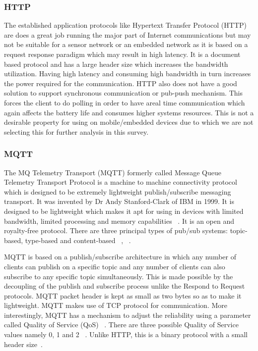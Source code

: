 \documentclass[conference]{IEEEtran}
\begin{document}
\subsubsection{HTTP}
The established application protocols like Hypertext Transfer Protocol (HTTP) are does a great job running the major part of Internet communications but may not be suitable for a sensor network or an embedded network as it is based on a request response paradigm which may result in high latency. It is a document based protocol and has a large header size which increases the bandwidth utilization. Having high latency and consuming high bandwidth in turn increases the power required for the communication. HTTP also does not have a good solution to support synchronous communication or pub-push mechanism. This forces the client to do polling in order to have areal time communication which again affects the battery life and consumes higher systems resources. This is not a desirable property for using on mobile/embedded devices due to which we are not selecting this for further analysis in this survey.

\subsubsection{MQTT}
The MQ Telemetry Transport (MQTT) formerly called Message Queue Telemetry Transport Protocol is a machine to machine connectivity protocol which is designed to be extremely lightweight publish/subscribe messaging transport. It was invented by Dr Andy Stanford-Clark of IBM in 1999. It is designed to be lightweight which makes it apt for using in devices with limited bandwidth, limited processing and memory capabilities ~\cite{mqtt4}. It is an open and royalty-free protocol. There are three principal types of pub/sub systems: topic-based, type-based and content-based ~\cite{urs-hunkeler}, ~\cite{eugster}.

MQTT is based on a publish/subscribe architecture in which any number of clients can publish on a specific topic and any number of clients can also subscribe to any specific topic simultaneously. This is made possible by the decoupling of the publish and subscribe process unlike the Respond to Request protocols. MQTT packet header is kept as small as two bytes so as to make it lightweight. MQTT makes use of TCP protocol for communication. More interestingly, MQTT has a mechanism to adjust the reliability using a parameter called Quality of Service (QoS) ~\cite{mqtt-coap-dinesh}. There are three possible Quality of Service values namely 0, 1 and 2 ~\cite{mqtt3}. Unlike HTTP, this is a binary protocol with a small header size~\cite{mqtt1}.
\end{document}
